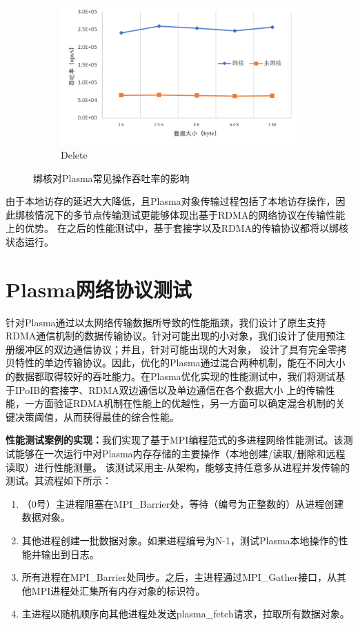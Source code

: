 \begin{figure}[h]
	\\
	\centering
    \begin{subfigure}{0.5\textwidth}
        \includegraphics[width=\textwidth]{image/chap04/del.png}
        \caption{Delete}
    \end{subfigure}
    \caption{绑核对Plasma常见操作吞吐率的影响}
    \label{fig:numa}
\end{figure}

由于本地访存的延迟大大降低，且Plasma对象传输过程包括了本地访存操作，因此绑核情况下的多节点传输测试更能够体现出基于RDMA的网络协议在传输性能上的优势。
在之后的性能测试中，基于套接字以及RDMA的传输协议都将以绑核状态运行。

\section{Plasma网络协议测试}

针对Plasma通过以太网络传输数据所导致的性能瓶颈，我们设计了原生支持RDMA通信机制的数据传输协议。针对可能出现的小对象，我们设计了使用预注册缓冲区的双边通信协议；并且，针对可能出现的大对象，
设计了具有完全零拷贝特性的单边传输协议。因此，优化的Plasma通过混合两种机制，能在不同大小的数据都取得较好的吞吐能力。在Plasma优化实现的性能测试中，我们将测试基于IPoIB的套接字、RDMA双边通信以及单边通信在各个数据大小
上的传输性能，一方面验证RDMA机制在性能上的优越性，另一方面可以确定混合机制的关键决策阈值，从而获得最佳的综合性能。

\textbf{性能测试案例的实现：}我们实现了基于MPI编程范式的多进程网络性能测试。该测试能够在一次运行中对Plasma内存存储的主要操作（本地创建/读取/删除和远程读取）进行性能测量。
该测试采用主-从架构，能够支持任意多从进程并发传输的测试。其流程如下所示：

\begin{enumerate}
	\item （0号）主进程阻塞在MPI\_Barrier处，等待（编号为正整数的）从进程创建数据对象。
	\item 其他进程创建一批数据对象。如果进程编号为N-1，测试Plasma本地操作的性能并输出到日志。
	\item 所有进程在MPI\_Barrier处同步。之后，主进程通过MPI\_Gather接口，从其他MPI进程处汇集所有内存对象的标识符。
	\item 主进程以随机顺序向其他进程处发送plasma\_fetch请求，拉取所有数据对象。
\end{enumerate}

